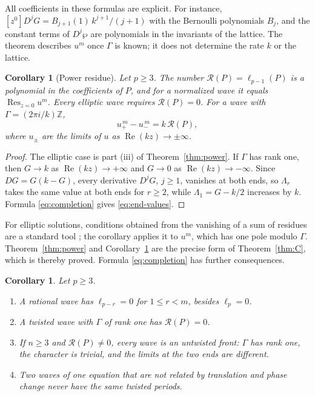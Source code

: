 \documentclass[11pt]{article}
\newtheorem{corollary}[theorem]{Corollary}
\theoremstyle{definition}
\theoremstyle{remark}
\numberwithin{equation}{section}
\newcommand{\ZZ}{\mathbb Z}
\DeclareMathOperator{\Res}{Res}
\begin{document}
All coefficients in these formulas are explicit. For instance,
\([z^0]D^jG=B_{j+1}(1)\,k^{j+1}/(j+1)\) with the Bernoulli polynomials
\(B_j\), and the constant terms of \(D^j\wp\) are polynomials in the
invariants of the lattice. The theorem describes \(u^m\) once \(\Gamma\)
is known; it does not determine the rate \(k\) or the lattice.

\begin{corollary}[Power residue]\label{cor:residue}
Let \(p\ge3\). The number \(\mathcal R(P)=\ell_{p-1}(P)\) is a polynomial in the
coefficients of \(P\), and for a normalized wave it equals
\(\Res_{z=0}u^m\). Every elliptic wave requires \(\mathcal R(P)=0\).
For a wave with \(\Gamma=(2\pi i/k)\ZZ\),
\begin{equation}\label{eq:end-values}
 u_+^{\,m}-u_-^{\,m}=k\,\mathcal R(P),
\end{equation}
where \(u_\pm\) are the limits of \(u\) as
\(\operatorname{Re}(kz)\to\pm\infty\).
\end{corollary}

\begin{proof}
The elliptic case is part (iii) of Theorem~\ref{thm:power}. If \(\Gamma\)
has rank one, then \(G\to k\) as \(\operatorname{Re}(kz)\to+\infty\)
and \(G\to0\) as \(\operatorname{Re}(kz)\to-\infty\). Since
\(DG=G(k-G)\), every derivative \(D^jG\), \(j\ge1\), vanishes at both
ends, so \(\Lambda_r\) takes the same value at both ends for \(r\ge2\),
while \(\Lambda_1=G-k/2\) increases by \(k\). Formula
\eqref{eq:completion} gives \eqref{eq:end-values}.
\end{proof}

For elliptic solutions, conditions obtained from the vanishing of a sum
of residues are a standard tool \citep{Hone2005,ConteNg2010}; the
corollary applies it to \(u^m\), which has one pole modulo \(\Gamma\).
Theorem~\ref{thm:power} and Corollary~\ref{cor:residue} are the precise
form of Theorem~\ref{thm:C}, which is thereby proved. Formula
\eqref{eq:completion} has further consequences.

\begin{corollary}\label{cor:power-consequences}
Let \(p\ge3\).
\begin{enumerate}[label=\textup{(\alph*)},leftmargin=2.2em]
\item A rational wave has \(\ell_{p-r}=0\) for \(1\le r<m\), besides
\(\ell_p=0\).
\item A twisted wave with \(\Gamma\) of rank one has
\(\mathcal R(P)=0\).
\item If \(n\ge3\) and \(\mathcal R(P)\ne0\), every wave is an
untwisted front: \(\Gamma\) has rank one, the character is trivial, and
the limits at the two ends are different.
\item Two waves of one equation that are not related by translation
and phase change never have the same twisted periods.
\end{enumerate}
\end{corollary}
\end{document}
